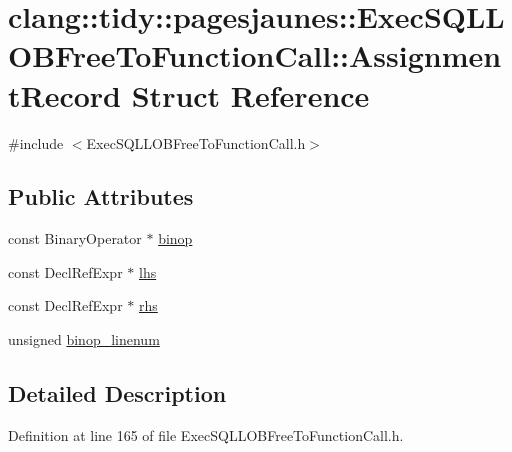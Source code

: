 \hypertarget{structclang_1_1tidy_1_1pagesjaunes_1_1_exec_s_q_l_l_o_b_free_to_function_call_1_1_assignment_record}{}\section{clang\+:\+:tidy\+:\+:pagesjaunes\+:\+:Exec\+S\+Q\+L\+L\+O\+B\+Free\+To\+Function\+Call\+:\+:Assignment\+Record Struct Reference}
\label{structclang_1_1tidy_1_1pagesjaunes_1_1_exec_s_q_l_l_o_b_free_to_function_call_1_1_assignment_record}


{\ttfamily \#include $<$Exec\+S\+Q\+L\+L\+O\+B\+Free\+To\+Function\+Call.\+h$>$}

\subsection*{Public Attributes}
\begin{DoxyCompactItemize}
\item 
const Binary\+Operator $\ast$ \hyperlink{structclang_1_1tidy_1_1pagesjaunes_1_1_exec_s_q_l_l_o_b_free_to_function_call_1_1_assignment_record_a3b3dd7720f99b47193dcebf3e6d02e77}{binop}
\item 
const Decl\+Ref\+Expr $\ast$ \hyperlink{structclang_1_1tidy_1_1pagesjaunes_1_1_exec_s_q_l_l_o_b_free_to_function_call_1_1_assignment_record_a66cd6761f386d9481dd97259c8ba859a}{lhs}
\item 
const Decl\+Ref\+Expr $\ast$ \hyperlink{structclang_1_1tidy_1_1pagesjaunes_1_1_exec_s_q_l_l_o_b_free_to_function_call_1_1_assignment_record_ab23408be5ddc6b039788126512e8f211}{rhs}
\item 
unsigned \hyperlink{structclang_1_1tidy_1_1pagesjaunes_1_1_exec_s_q_l_l_o_b_free_to_function_call_1_1_assignment_record_ad7b7901448547fc2989817b33a54bf77}{binop\+\_\+linenum}
\end{DoxyCompactItemize}


\subsection{Detailed Description}


Definition at line 165 of file Exec\+S\+Q\+L\+L\+O\+B\+Free\+To\+Function\+Call.\+h.



